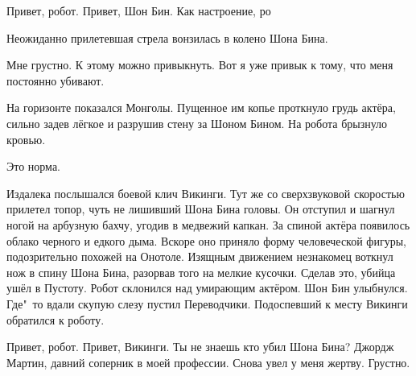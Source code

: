{\footnotesize \begin{dialog}
\X Привет, робот.
\R Привет, Шон Бин.
\X Как настроение, ро\ldotsq{}
\end{dialog}

\begin{monolog}
Неожиданно прилетевшая стрела вонзилась в колено Шона Бина.
\end{monolog}

\begin{dialog}
\R Мне грустно.
\X К этому можно привыкнуть. Вот я уже привык к тому, что меня постоянно убивают.
\end{dialog}

\begin{monolog}
На горизонте показался Монголы. Пущенное им копье проткнуло грудь актёра, сильно задев лёгкое и разрушив стену за Шоном Бином. На робота брызнуло кровью.
\end{monolog}

\begin{dialog}
\X Это норма.
\end{dialog}

\begin{monolog}
Издалека послышался боевой клич Викинги. Тут же со сверхзвуковой скоростью прилетел топор, чуть не лишивший Шона Бина головы. Он отступил и шагнул ногой на арбузную бахчу, угодив в медвежий капкан. За спиной актёра появилось облако черного и едкого дыма. Вскоре оно приняло форму человеческой фигуры, подозрительно похожей на Онотоле. Изящным движением незнакомец воткнул нож в спину Шона Бина, разорвав того на мелкие кусочки. Сделав это, убийца ушёл в Пустоту. Робот склонился над умирающим актёром. Шон Бин улыбнулся. Где"~то вдали скупую слезу пустил Переводчики. Подоспевший к месту Викинги обратился к роботу.
\end{monolog}

\begin{dialog}
\X Привет, робот.
\R Привет, Викинги. Ты не знаешь кто убил Шона Бина?
\X Джордж Мартин, давний соперник в моей профессии. Снова увел у меня жертву.
\R Грустно. %
\end{dialog}}